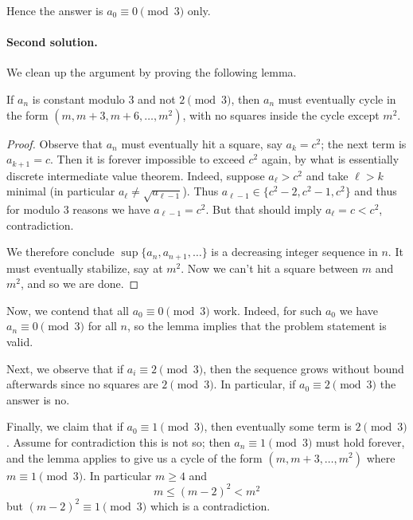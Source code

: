 Hence the answer is $a_0 \equiv 0 \pmod 3$ only.

\paragraph{Second solution.}
We clean up the argument by proving the following lemma.
\begin{lemma*}
  If $a_n$ is constant modulo $3$ and not $2 \pmod 3$,
  then $a_n$ must eventually cycle in the form
  $(m, m+3, m+6, \dots, m^2)$,
  with no squares inside the cycle except $m^2$.
\end{lemma*}
\begin{proof}
  Observe that $a_n$ must eventually hit a square, say $a_k = c^2$;
  the next term is $a_{k+1} = c$.
  Then it is forever impossible to exceed $c^2$ again,
  by what is essentially discrete intermediate value theorem.
  Indeed, suppose $a_\ell > c^2$ and take $\ell > k$ minimal
  (in particular $a_{\ell} \neq \sqrt{a_{\ell-1}}$).
  Thus $a_{\ell-1} \in \{c^2-2, c^2-1, c^2\}$
  and thus for modulo $3$ reasons we have $a_{\ell-1} = c^2$.
  But that should imply $a_\ell = c < c^2$, contradiction.

  We therefore conclude $\sup \{a_n, a_{n+1}, \dots \}$ is a
  decreasing integer sequence in $n$.
  It must eventually stabilize, say at $m^2$.
  Now we can't hit a square between $m$ and $m^2$,
  and so we are done.
\end{proof}

Now, we contend that all $a_0 \equiv 0 \pmod 3$ work.
Indeed, for such $a_0$ we have $a_n \equiv 0 \pmod 3$ for all $n$,
so the lemma implies that the problem statement is valid.

Next, we observe that if $a_i \equiv 2 \pmod 3$,
then the sequence grows without bound afterwards
since no squares are $2 \pmod 3$.
In particular, if $a_0 \equiv 2 \pmod 3$ the answer is no.

Finally, we claim that if $a_0 \equiv 1 \pmod 3$,
then eventually some term is $2 \pmod 3$.
Assume for contradiction this is not so;
then $a_n \equiv 1 \pmod 3$ must hold forever,
and the lemma applies to give us a cycle of the form
$(m, m+3, \dots, m^2)$ where $m \equiv 1 \pmod 3$.
In particular $m \ge 4$ and
\[ m \le (m-2)^2 < m^2 \]
but $(m-2)^2 \equiv 1 \pmod 3$ which is a contradiction.
\pagebreak